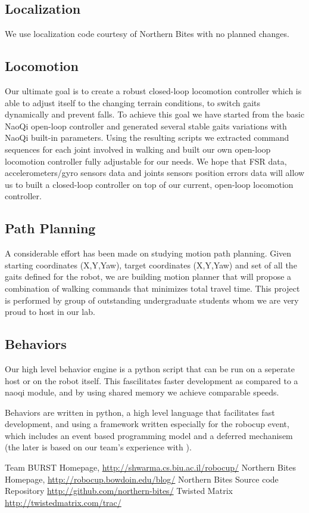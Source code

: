 \documentclass[runningheads,a4paper]{llncs}
\begin{document}
\subsection{Localization}
\label{localization}
We use localization code courtesy of Northern Bites \cite{northern,northern-repo} with no planned changes.

\subsection{Locomotion}
Our ultimate goal is to create a robust closed-loop locomotion controller which is able to adjust itself to the changing terrain conditions, to switch gaits dynamically and prevent falls. To achieve this goal we have started from the basic NaoQi open-loop controller and generated several stable gaits variations with NaoQi built-in parameters. Using the resulting scripts we extracted command sequences for each joint involved in walking and built our own open-loop locomotion controller fully adjustable for our needs. We hope that FSR data, accelerometers/gyro sensors data and joints sensors position errors data will allow us to built a closed-loop controller on top of our current, open-loop locomotion controller.

\subsection{Path Planning}
A considerable effort has been made on studying motion path planning. Given starting coordinates (X,Y,Yaw), target coordinates (X,Y,Yaw) and set of all the gaits defined for the robot, we are building motion planner that will propose a combination of walking commands that minimizes total travel time. This project is performed by group of outstanding undergraduate students whom we are very proud to host in our lab.

\subsection{Behaviors}
\label{behavior}
Our high level behavior engine is a python script that can be run on a seperate host or on the robot itself. This fascilitates faster development as compared to a naoqi module, and by using shared memory we achieve comparable speeds. 

Behaviors are written in python, a high level language that facilitates fast development, and using a framework written especially for the robocup event, which includes an event based programming model and a deferred mechanisem (the later is based on our team's experience with \cite{twisted}).

\label{references}


\begin{thebibliography}{4}

 Team BURST Homepage, \url{http://shwarma.cs.biu.ac.il/robocup/}
 Northern Bites Homepage,
\url{http://robocup.bowdoin.edu/blog/}
 Northern Bites Source code Repository
\url{http://github.com/northern-bites/}
 Twisted Matrix
\url{http://twistedmatrix.com/trac/}
\end{thebibliography}
\end{document}
